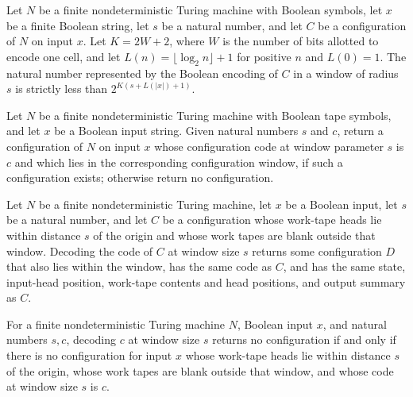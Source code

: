 \begin{theorem}
\label{Complexity.Codec.cfgCode_lt}
\leanok
{}
Let $N$ be a finite nondeterministic Turing machine with Boolean symbols, let $x$ be a
finite Boolean string, let $s$ be a natural number, and let $C$ be a configuration of
$N$ on input $x$. Let $K=2W+2$, where $W$ is the number of bits allotted to encode one
cell, and let $L(n)=\lfloor\log_2 n\rfloor+1$ for positive $n$ and $L(0)=1$. The natural
number represented by the Boolean encoding of $C$ in a window of radius $s$ is strictly
less than $2^{K(s+L(|x|)+1)}$.
\end{theorem}

\begin{definition}
\label{Complexity.Codec.decodeCfg}
\leanok
{}
Let $N$ be a finite nondeterministic Turing machine with Boolean tape symbols, and let
$x$ be a Boolean input string. Given natural numbers $s$ and $c$, return a configuration
of $N$ on input $x$ whose configuration code at window parameter $s$ is $c$ and which
lies in the corresponding configuration window, if such a configuration exists;
otherwise return no configuration.
\end{definition}

\begin{theorem}
\label{Complexity.Codec.decodeCfg_cfgCode}
\leanok
{}
Let $N$ be a finite nondeterministic Turing machine, let $x$ be a Boolean input, let $s$
be a natural number, and let $C$ be a configuration whose work-tape heads lie within
distance $s$ of the origin and whose work tapes are blank outside that window. Decoding
the code of $C$ at window size $s$ returns some configuration $D$ that also lies within
the window, has the same code as $C$, and has the same state, input-head position,
work-tape contents and head positions, and output summary as $C$.
\end{theorem}

\begin{theorem}
\label{Complexity.Codec.decodeCfg_eq_none}
\leanok
{}
For a finite nondeterministic Turing machine $N$, Boolean input $x$, and natural numbers
$s,c$, decoding $c$ at window size $s$ returns no configuration if and only if there is
no configuration for input $x$ whose work-tape heads lie within distance $s$ of the
origin, whose work tapes are blank outside that window, and whose code at window size
$s$ is $c$.
\end{theorem}

